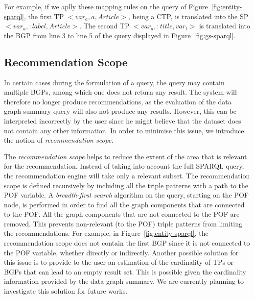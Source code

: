 For example, if we aplly these mapping rules on the query of Figure~\ref{fig:entity-sparql}, the first TP \mbox{$<var_a, a, Article>$}, being a CTP, is translated into the SP \mbox{$<var_a, :label, Article>$}. The second TP \mbox{$<var_a, :title, var_t>$} is translated into the BGP from line 3 to line 5 of the query displayed in Figure~\ref{fig:gs-sparql}.

\subsection{Recommendation Scope}

In certain cases during the formulation of a query, the query may contain multiple BGPs, among which one does not return any result. The system will therefore no longer produce recommendations, as the evaluation of the data graph summary query will also not produce any results. However, this can be interpreted incorrectly by the user since he might believe that the dataset does not contain any other information. In order to minimise this issue, we introduce the notion of \emph{recommendation scope}.

The \emph{recommendation scope} helps to reduce the extent of the area that is relevant for the recommendation. Instead of taking into account the full SPARQL query, the recommendation engine will take only a relevant subset. The recommendation scope is defined recursively by including all the triple patterns with a path to the POF variable. A \emph{breadth-first search} algorithm on the query, starting on the POF node, is performed in order to find all the graph components that are connected to the POF. All the graph components that are not connected to the POF are removed. This prevents non-relevant (to the POF) triple patterns from limiting the recommendations. For example, in Figure~\ref{fig:entity-sparql}, the recommendation scope does not contain the first BGP since it is not connected to the POF variable, whether directly or indirectly. Another possible solution for this issue is to provide to the user an estimation of the cardinality of TPs or BGPs that can lead to an empty result set. This is possible given the cardinality information provided by the data graph summary. We are currently planning to investigate this solution for future works.


